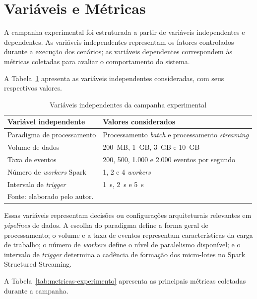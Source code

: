 \section{Variáveis e Métricas}
\label{sec:variaveis-metricas}
 
A campanha experimental foi estruturada a partir de variáveis independentes e dependentes. As variáveis independentes representam os fatores controlados durante a execução dos cenários; as variáveis dependentes correspondem às métricas coletadas para avaliar o comportamento do sistema.
 
A Tabela~\ref{tab:variaveis-independentes} apresenta as variáveis independentes consideradas, com seus respectivos valores.
 
\begin{table}[htbp]
\centering
\caption{Variáveis independentes da campanha experimental}
\label{tab:variaveis-independentes}
\small
\setlength{\tabcolsep}{6pt}
\renewcommand{\arraystretch}{1.35}
\begin{tabular}{p{4.8cm} p{7.8cm}}
\toprule
\textbf{Variável independente} & \textbf{Valores considerados} \\
\midrule
Paradigma de processamento    & Processamento \textit{batch} e processamento \textit{streaming} \\
Volume de dados               & 200~MB, 1~GB, 3~GB e 10~GB \\
Taxa de eventos               & 200, 500, 1.000 e 2.000 eventos por segundo \\
Número de \textit{workers} Spark & 1, 2 e 4 \textit{workers} \\
Intervalo de \textit{trigger} & 1~s, 2~s e 5~s \\
\bottomrule
\multicolumn{2}{l}{\footnotesize Fonte: elaborado pelo autor.}
\end{tabular}
\end{table}
 
Essas variáveis representam decisões ou configurações arquiteturais relevantes em \textit{pipelines} de dados. A escolha do paradigma define a forma geral de processamento; o volume e a taxa de eventos representam características da carga de trabalho; o número de \textit{workers} define o nível de paralelismo disponível; e o intervalo de \textit{trigger} determina a cadência de formação dos micro-lotes no Spark Structured Streaming.
 
A Tabela~\ref{tab:metricas-experimento} apresenta as principais métricas coletadas durante a campanha.
 
